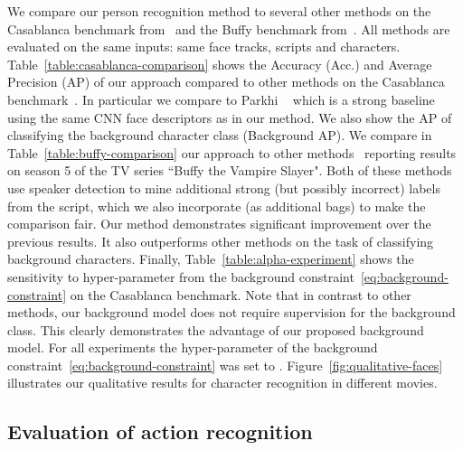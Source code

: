 \documentclass[10pt,twocolumn,letterpaper]{article}
\begin{document}
We compare our person recognition method to several other methods on the Casablanca benchmark from~\cite{bojanowski13finding} and
the Buffy benchmark from~\cite{sivic09who}.
All methods are evaluated on the same inputs: same face tracks, scripts and characters. Table~\ref{table:casablanca-comparison} shows the Accuracy (Acc.) and Average Precision (AP) of
our approach compared to other methods on the Casablanca benchmark~\cite{bojanowski13finding}. In particular we compare to Parkhi \etal~\cite{parkhi15it} which is a strong baseline using the same CNN face descriptors as in our method.
We also show the AP of classifying the background character class (Background AP). We compare in Table~\ref{table:buffy-comparison} our approach to other methods~\cite{parkhi15it,sivic09who} reporting results on season 5 of the TV series ``Buffy the Vampire Slayer".
Both of these methods~\cite{parkhi15it,sivic09who} use speaker detection to mine additional strong (but possibly incorrect) labels from the script, which we also incorporate (as additional bags) to make the comparison fair.
Our method demonstrates significant improvement over the previous results. It also outperforms other methods on the task of classifying background characters.
Finally, Table~\ref{table:alpha-experiment} shows the sensitivity to hyper-parameter  from the background constraint~\eqref{eq:background-constraint} on the Casablanca benchmark.
Note that in contrast to other methods, our background model does not require supervision for the background class. 
This clearly demonstrates the advantage of our proposed background model. For all experiments the hyper-parameter  of the background constraint~\eqref{eq:background-constraint} was set to .
Figure~\ref{fig:qualitative-faces} illustrates our qualitative results for character recognition in different movies.


\subsection{Evaluation of action recognition}
\end{document}
